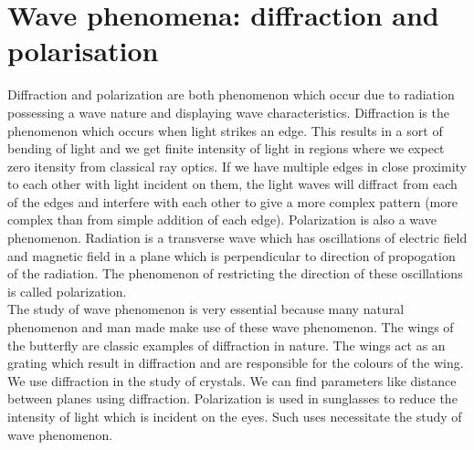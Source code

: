 \documentclass[12pt]{report}
\begin{document}
\section{Wave phenomena: diffraction and polarisation}
Diffraction and polarization are both phenomenon which occur due to radiation possessing a wave nature and displaying wave characteristics. Diffraction is the phenomenon which occurs when light strikes an edge. This results in a sort of bending of light and  we get finite intensity of light in regions where we expect zero itensity from classical ray optics. If we have multiple edges in close proximity to each other with light incident on them, the light waves will diffract from each of the edges and interfere with each other to give a more complex pattern (more complex than from simple addition of each edge). 
Polarization is also a wave phenomenon. Radiation is a transverse wave which has oscillations of electric field and magnetic field in a plane which is perpendicular to direction of propogation of the radiation. The phenomenon of restricting the direction of these oscillations is called polarization. \\
The study of wave phenomenon is very essential because many natural phenomenon and man made make use of these wave phenomenon. The wings of the butterfly are classic examples of diffraction in nature. The wings act as an grating which result in diffraction and are responsible for the colours of the wing. We use diffraction in the study of crystals. We can find parameters like distance between planes using diffraction. Polarization is used in sunglasses to reduce the intensity of light which is incident on the eyes. Such uses necessitate the study of wave phenomenon.
\end{document}
